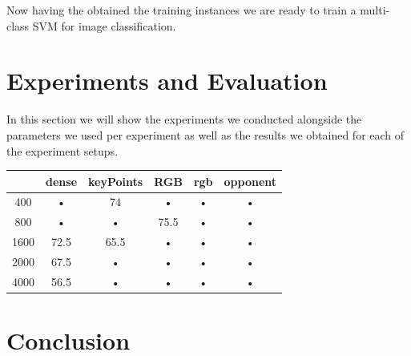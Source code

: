 \documentclass[11pt]{article}
\begin{document}
Now having the obtained the training instances we are ready to train a multi-class SVM for image classification.

\section{Experiments and Evaluation}
In this section we will show the experiments we conducted alongside the parameters we used per experiment as well as the results we obtained for each of the experiment setups.

\begin{table}
\begin{tabular}{c|ccccc}
 & dense & keyPoints & RGB & rgb & opponent \\ 
\hline 
400 & • & 74 & • & • & • \\ 
800 & • & • & 75.5 & • & • \\ 
1600 & 72.5 & 65.5 & • & • & • \\ 
2000 & 67.5 & • & • & • & • \\ 
4000 & 56.5 & • & • & • & • \\ 
\end{tabular}
\label{Accuracy of the different models}
\end{table}

\section{Conclusion}

{}

\end{document}
